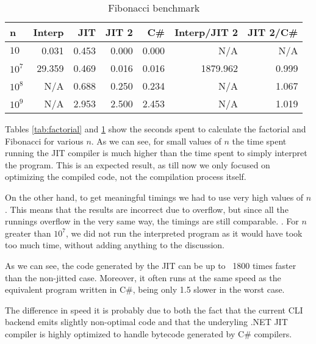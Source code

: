 \begin{table}[ht]
  \begin{tabular}{|l|r|r|r|r||r|r|}
    \hline
    \textbf{n} & 
    \textbf{Interp} &
    \textbf{JIT} &
    \textbf{JIT 2} &
    \textbf{C\#} &
    \textbf{Interp/JIT 2} &
    \textbf{JIT 2/C\#} \\
    \hline

    $10$    &   0.031  &  0.453  &  0.000  &  0.000  &       N/A  &  N/A   \\
    $10^7$  &  29.359  &  0.469  &  0.016  &  0.016  &  1879.962  &  0.999 \\
    $10^8$  &     N/A  &  0.688  &  0.250  &  0.234  &       N/A  &  1.067 \\
    $10^9$  &     N/A  &  2.953  &  2.500  &  2.453  &       N/A  &  1.019 \\

    \hline

  \end{tabular}
  \caption{Fibonacci benchmark}
  \label{tab:fibo}
\end{table}


Tables \ref{tab:factorial} and \ref{tab:fibo} show the seconds spent to calculate
the factorial and Fibonacci for various $n$.  As we can see, for small values
of $n$ the time spent running the JIT compiler is much higher than the time
spent to simply interpret the program.  This is an expected result, as till
now we only focused on optimizing the compiled code, not the compilation
process itself.

On the other hand, to get meaningful timings we had to use very high values of
$n$.  This means that the results are incorrect due to overflow, but since all
the runnings overflow in the very same way, the timings are still
comparable. .  For $n$ greater
than $10^7$, we did not run the interpreted program as it would have took too
much time, without adding anything to the discussion.

As we can see, the code generated by the JIT can be up to ~1800 times faster
than the non-jitted case.  Moreover, it often runs at the same speed as the
equivalent program written in C\#, being only 1.5 slower in the worst case.

The difference in speed it is probably due to both the fact that the current
CLI backend emits slightly non-optimal code and that the underyling .NET JIT
compiler is highly optimized to handle bytecode generated by C\# compilers.

